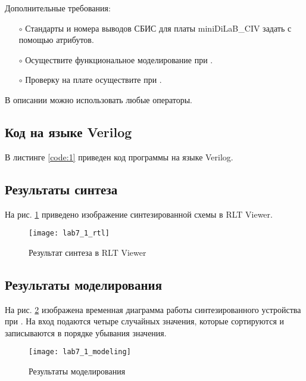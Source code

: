 Дополнительные требования:
\begin{itemize}
	\item[$\circ$] Стандарты и номера выводов СБИС для платы miniDiLaB\_CIV задать с помощью атрибутов.
	\item[$\circ$] Осуществите функциональное моделирование при .
	\item[$\circ$] Проверку на плате осуществите при .
\end{itemize}
В описании можно использовать любые операторы.

\subsection{Код на языке Verilog}

В листинге \ref{code:1} приведен код программы на языке Verilog.



\newpage

\subsection{Результаты синтеза}

На рис. \ref{fig:lab7_1_rtl} приведено изображение синтезированной схемы в RLT Viewer.
\begin{figure}[H]
\begin{center}
	\texttt{[image: lab7\_1\_rtl]}
	\caption{Результат синтеза в RLT Viewer}
	\label{fig:lab7_1_rtl}
\end{center}
\end{figure}
\vspace{-1cm}

\subsection{Результаты моделирования}
\label{sec:lab7_1_modeling}

На рис. \ref{fig:lab7_1_modeling} изображена временная диаграмма работы синтезированного устройства при . На вход подаются четыре случайных значения, которые сортируются и записываются в порядке убывания значения.

\begin{figure}[H]
\begin{center}
	\texttt{[image: lab7\_1\_modeling]}
	\caption{Результаты моделирования}
	\label{fig:lab7_1_modeling}
\end{center}
\end{figure}

